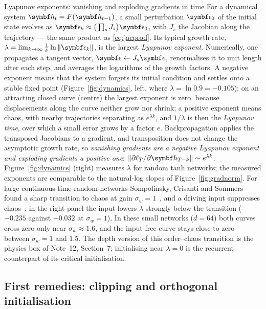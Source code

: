\documentclass[11pt]{article}
\newcommand{\hv}{\vect{h}}
\begin{document}
\begin{physics}{Lyapunov exponents: vanishing and exploding gradients in time}
For a dynamical system $\hv_t = F(\hv_{t-1})$, a small perturbation $\vect{\epsilon}_0$ of the initial state evolves as
$\vect{\epsilon}_k \approx \big(\prod_s J_s\big)\vect{\epsilon}_0$, with $J_s$ the Jacobian along the trajectory --- the
same product as \eqref{eq:jacprod}. Its typical growth rate, $\lambda = \lim_{k\to\infty}\frac1k\ln\norm{\vect{\epsilon}_k}$,
is the largest \emph{Lyapunov exponent}. Numerically, one propagates a tangent vector, $\vect{\epsilon} \gets J_s\vect{\epsilon}$,
renormalises it to unit length after each step, and averages the logarithms of the growth factors. A negative exponent
means that the system forgets its initial condition and settles onto a stable fixed point (Figure~\ref{fig:dynamics},
left, where $\lambda = \ln 0.9 = -0.105$); on an attracting closed curve (centre) the largest exponent is zero, because
displacements along the curve neither grow nor shrink; a positive exponent means chaos, with nearby trajectories
separating as $e^{\lambda k}$, and $1/\lambda$ is then the \emph{Lyapunov time}, over which a small error grows by a
factor $e$. Backpropagation applies the transposed Jacobians to a gradient, and transposition does not change the
asymptotic growth rate, so \emph{vanishing gradients are a negative Lyapunov exponent and exploding gradients a positive
one}: $\norm{\partial\ell_T/\partial\hv_{T-k}} \sim e^{\lambda k}$. Figure~\ref{fig:dynamics} (right) measures $\lambda$ for
random tanh networks; the measured exponents are comparable to the natural-log slopes of Figure~\ref{fig:gradnorm}. For
large continuous-time random networks Sompolinsky, Crisanti and Sommers found a sharp transition to chaos at gain
$\sigma_w = 1$~\cite{sompolinsky1988}, and a driving input suppresses chaos~\cite{rajan2010}: in the right panel the input
lowers $\lambda$ strongly below the transition ($-0.235$ against $-0.032$ at $\sigma_w = 1$). In these small networks
($d = 64$) both curves cross zero only near $\sigma_w \approx 1.6$, and the input-free curve stays close to zero between $\sigma_w = 1$
and $1.5$. The depth version of this order--chaos transition is the physics box of Note~12, Section~7; initialising
near $\lambda = 0$ is the recurrent counterpart of its critical initialisation.
\end{physics}

\subsection{First remedies: clipping and orthogonal initialisation}\label{sec:remedies}
\end{document}
